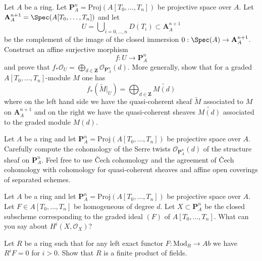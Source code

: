 \begin{exercise}
\label{exercise-affine-morphism-to-Pn}
Let $A$ be a ring. Let $\mathbf{P}^n_A = \text{Proj}(A[T_0, \ldots, T_n])$
be projective space over $A$. Let
$\mathbf{A}^{n + 1}_A = \Spec(A[T_0, \ldots, T_n])$ and let
$$
U = \bigcup\nolimits_{i = 0, \ldots, n} D(T_i) \subset \mathbf{A}^{n + 1}_A
$$
be the complement of the image of the closed immersion
$0 : \Spec(A) \to \mathbf{A}^{n + 1}_A$.
Construct an affine surjective morphism
$$
f : U \longrightarrow \mathbf{P}^n_A
$$
and prove that $f_*\mathcal{O}_U =
\bigoplus_{d \in \mathbf{Z}} \mathcal{O}_{\mathbf{P}^n_A}(d)$.
More generally, show that for a graded $A[T_0, \ldots, T_n]$-module $M$
one has
$$
f_*(\widetilde{M}|_U) =
\bigoplus\nolimits_{d \in \mathbf{Z}} \widetilde{M(d)}
$$
where on the left hand side we have the quasi-coherent sheaf
$\widetilde{M}$ associated to $M$ on $\mathbf{A}^{n + 1}_A$
and on the right we have the quasi-coherent sheaves
$\widetilde{M(d)}$ associated to the graded module $M(d)$.
\end{exercise}

\begin{exercise}
\label{exercise-compute-Pn}
Let $A$ be a ring and let $\mathbf{P}^n_A = \text{Proj}(A[T_0, \ldots, T_n])$
be projective space over $A$.
Carefully compute the cohomology of the Serre twists
$\mathcal{O}_{\mathbf{P}^n_A}(d)$ of the structure
sheaf on $\mathbf{P}^n_A$. Feel free to use {\v C}ech cohomology
and the agreement of {\v C}ech cohomology with cohomology
for quasi-coherent sheaves and affine open coverings of separated schemes.
\end{exercise}

\begin{exercise}
\label{exercise-cohomology-hypersurface}
Let $A$ be a ring and let $\mathbf{P}^n_A = \text{Proj}(A[T_0, \ldots, T_n])$
be projective space over $A$. Let
$F \in A[T_0, \ldots, T_n]$ be homogeneous of degree $d$.
Let $X \subset \mathbf{P}^n_A$ be the closed subscheme
corresponding to the graded ideal $(F)$ of $A[T_0, \ldots, T_n]$.
What can you say about $H^i(X, \mathcal{O}_X)$?
\end{exercise}

\begin{exercise}
\label{exercise-characterize-finite-product-fields}
Let $R$ be a ring such that for any left exact functor
$F : \text{Mod}_R \to \textit{Ab}$ we have
$R^iF = 0$ for $i > 0$. Show that $R$ is a finite product
of fields.
\end{exercise}






